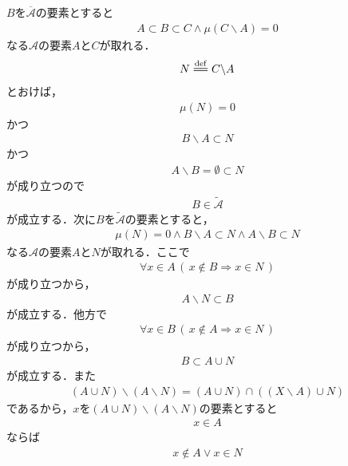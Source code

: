 		\begin{sketch}
			$B$を$\overline{\mathscr{A}}$の要素とすると
			\begin{align}
				A \subset B \subset C \wedge \mu(C \backslash A)=0
			\end{align}
			なる$\mathscr{A}$の要素$A$と$C$が取れる．
			\begin{align}
				N \defeq C \backslash A
			\end{align}
			とおけば，
			\begin{align}
				\mu(N) = 0
			\end{align}
			かつ
			\begin{align}
				B \backslash A \subset N
			\end{align}
			かつ
			\begin{align}
				A \backslash B = \emptyset \subset N
			\end{align}
			が成り立つので
			\begin{align}
				B \in \tilde{\mathscr{A}}
			\end{align}
			が成立する．次に$B$を$\tilde{\mathscr{A}}$の要素とすると，
			\begin{align}
				\mu(N) = 0 \wedge B \backslash A \subset N \wedge A \backslash B \subset N
			\end{align}
			なる$\mathscr{A}$の要素$A$と$N$が取れる．ここで
			\begin{align}
				\forall x \in A\, (\, x \notin B \Longrightarrow x \in N\, )
			\end{align}
			が成り立つから，
			\begin{align}
				A \backslash N \subset B
			\end{align}
			が成立する．他方で
			\begin{align}
				\forall x \in B\, (\, x \notin A \Longrightarrow x \in N\, )
			\end{align}
			が成り立つから，
			\begin{align}
				B \subset A \cup N
			\end{align}
			が成立する．また
			\begin{align}
				(A \cup N) \backslash (A \backslash N)
				= (A \cup N) \cap ((X \backslash A) \cup N)
			\end{align}
			であるから，$x$を$(A \cup N) \backslash (A \backslash N)$の要素とすると
			\begin{align}
				x \in A
			\end{align}
			ならば
			\begin{align}
				x \notin A \vee x \in N
			\end{align}

\end{sketch}
